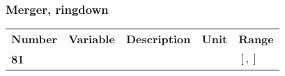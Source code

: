 \documentclass[11pt]{article}
\begin{document}
\subsubsection{Merger, ringdown}
\begin{tabular}{lllll}
  \textbf{Number} & \textbf{Variable} & \textbf{Description} & \textbf{Unit} & \textbf{Range} \\
  \textbf{81} &   & & & $[,]$ \\
\end{tabular}

\end{document}

